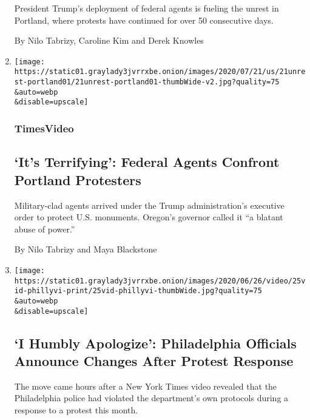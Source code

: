 \begin{enumerate}
  President Trump's deployment of federal agents is fueling the unrest
  in Portland, where protests have continued for over 50 consecutive
  days.

  By Nilo Tabrizy, Caroline Kim and Derek Knowles
\item
  \href{/video/us/100000007248945/portland-protests-federal-agents.html}{}

  \texttt{[image: https://static01.graylady3jvrrxbe.onion/images/2020/07/21/us/21unrest-portland01/21unrest-portland01-thumbWide-v2.jpg?quality=75\\\&auto=webp\\\&disable=upscale]}

  \hypertarget{timesvideo-6}{%
  \subsubsection{TimesVideo}\label{timesvideo-6}}

  \hypertarget{its-terrifying-federal-agents-confront-portland-protesters}{%
  \subsection{`It's Terrifying': Federal Agents Confront Portland
  Protesters}\label{its-terrifying-federal-agents-confront-portland-protesters}}

  Military-clad agents arrived under the Trump administration's
  executive order to protect U.S. monuments. Oregon's governor called it
  ``a blatant abuse of power.''

  By Nilo Tabrizy and Maya Blackstone
\item
  \href{/2020/06/25/video/philadelphia-police-tear-gas.html}{}

  \texttt{[image: https://static01.graylady3jvrrxbe.onion/images/2020/06/26/video/25vid-phillyvi-print/25vid-phillyvi-thumbWide.jpg?quality=75\\\&auto=webp\\\&disable=upscale]}

  \hypertarget{i-humbly-apologize-philadelphia-officials-announce-changes-after-protest-response}{%
  \subsection{`I Humbly Apologize': Philadelphia Officials Announce
  Changes After Protest
  Response}\label{i-humbly-apologize-philadelphia-officials-announce-changes-after-protest-response}}

  The move came hours after a New York Times video revealed that the
  Philadelphia police had violated the department's own protocols during
  a response to a protest this month.


\end{enumerate}
